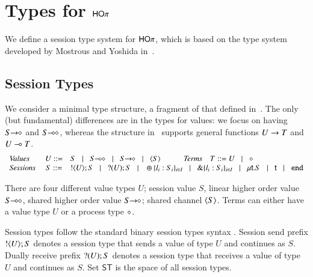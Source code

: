 \section{Types for $\mathsf{HO}\pi$}

We define a session type system for $\mathsf{HO}\pi$, which is based on the type system developed by Mostrous
and Yoshida in~\cite{tlca07}.

\subsection{Session Types}
We consider a minimal type structure, a fragment of that defined in~\cite{tlca07}.
The only (but fundamental) differences are in the types for values: we focus on having 
$S\!\! \rightarrow\!\! \diamond$ and $S\!\! \multimap\!\! \diamond$, whereas the structure in~\cite{tlca07} supports general functions $U \rightarrow T$ and 
$U \multimap T$.
\[
	\begin{array}{lcl}
		\text{\emph{Values}} & U ::= & S \bnfbar \lhot{S} \bnfbar \shot{S} \bnfbar \chtype{S} \qquad \quad \text{\emph{Terms}} \quad T ::= U  \bnfbar  \Proc\\
		\text{\emph{Sessions}} \ & S ::= &  \btout{U} S \bnfbar \btinp{U} S
		\bnfbar		\btsel{l_i:S_i}_{i \in I} \bnfbar \btbra{l_i:S_i}_{i \in I} \bnfbar \trec{t}{S} \bnfbar \vart{t}  \bnfbar \tinact 
	\end{array}
\]

There are four different value types $U$; session value $S$, linear higher order value $S\!\! \multimap\!\! \diamond$, 
shared higher order value $S\!\! \rightarrow\!\! \diamond$; shared channel $\langle S \rangle$. Terms can either have a
value type $U$ or a process type $\diamond$.

Session types follow the standard binary session types syntax \cite{}. Session send prefix $! \langle U \rangle ; S$ 
denotes a session type that sends a value of type $U$ and continues as $S$. Dually receive prefix $? (U) ; S$
denotes a session type that receives a value of type $U$ and continues as $S$. 
Set $\mathsf{ST}$ is the space of all session types.

